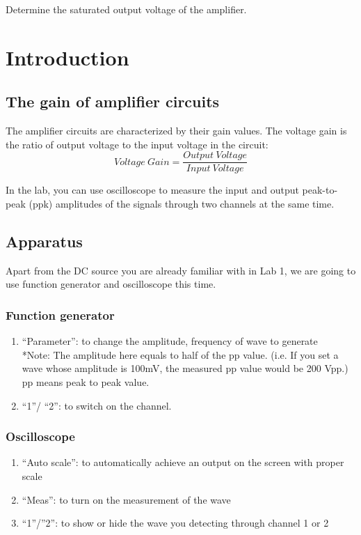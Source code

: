 \documentclass{article}
\begin{document}
Determine the saturated output voltage of the amplifier.

\section{Introduction}


\subsection{The gain of amplifier circuits}
The amplifier circuits are characterized by their gain values. The voltage gain is the ratio of output voltage to the input voltage in the circuit:
$$Voltage\ Gain=\frac{Output\ Voltage}{Input\ Voltage}$$

In the lab, you can use oscilloscope to measure the input and output peak-to-peak (ppk) amplitudes of the signals through two channels at the same time.

\subsection{Apparatus}
Apart from the DC source you are already familiar with in Lab 1, we are going to use function generator and oscilloscope this time.

\subsubsection{Function generator}

\begin{enumerate}
\item
“Parameter”: to change the amplitude, frequency of wave to generate\\
*Note: The amplitude here equals to half of the pp value. (i.e. If you set a wave whose amplitude is 100mV, the measured pp value would be 200 Vpp.) pp means peak to peak value.
\item
“1”/ “2”: to switch on the channel.
\end{enumerate}

\subsubsection{Oscilloscope}

\begin{enumerate}
\item
“Auto scale”: to automatically achieve an output on the screen with proper scale
\item
“Meas”: to turn on the measurement of the wave
\item
“1”/”2”: to show or hide the wave you detecting through channel 1 or 2
\end{enumerate}
\end{document}
